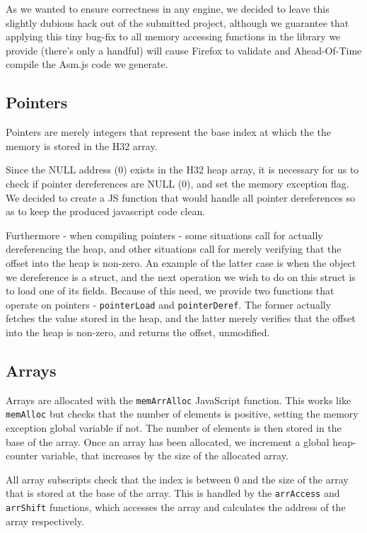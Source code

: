 \documentclass[twoside]{article}
\begin{document}
\begin{multicols}{2}
    As we wanted
    to ensure correctness in any engine, we decided to leave this slightly dubious hack out
    of the submitted project, although we guarantee that applying this tiny bug-fix to all
    memory accessing functions in the library we provide (there's only a handful) will cause Firefox
    to validate and Ahead-Of-Time compile the Asm.js code we generate. 

  \subsection{Pointers}
    Pointers are merely integers that represent the base index at which the
    the memory is stored in the H32 array.

    Since the NULL address (0) exists in the H32 heap array, it is necessary for
    us to check if pointer dereferences are NULL (0), and set the memory 
    exception flag. We decided to create a JS function that would handle all
    pointer dereferences so as to keep the produced javascript code clean. 

    Furthermore - when compiling pointers - some situations call for actually
    dereferencing the heap, and other situations call for merely verifying that 
    the offset into the heap is non-zero. An example of the latter case is when
    the object we dereference is a struct, and the next operation we wish to do
    on this struct is to load one of its fields. Because of this need, we provide
    two functions that operate on pointers - \texttt{pointerLoad} and \texttt{pointerDeref}. 
    The former actually fetches the value stored in the heap, and the latter
    merely verifies that the offset into the heap is non-zero, and returns the offset,
    unmodified. 

  \subsection{Arrays}
    Arrays are allocated with the \texttt{memArrAlloc} JavaScript function. This
    works like \texttt{memAlloc} but checks that the number of elements is
    positive, setting the memory exception global variable if not. The number of elements
    is then stored in the base of the array. Once an array has been allocated, we increment
    a global heap-counter variable, that increases by the size of the allocated array.

    All array subscripts check that the index is between 0 and the size of the
    array that is stored at the base of the array. This is handled by the
    \texttt{arrAccess} and \texttt{arrShift} functions, which accesses the array
    and calculates the address of the array respectively.


\end{multicols}
\end{document}
